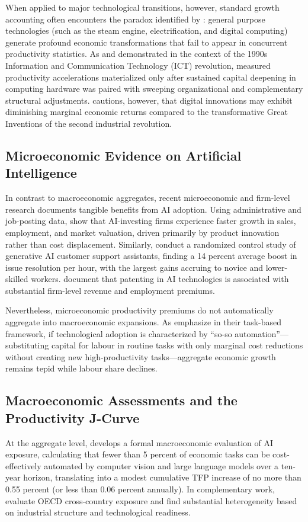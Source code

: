 \documentclass[11pt,a4paper]{article}
\begin{document}
When applied to major technological transitions, however, standard growth accounting often encounters the paradox identified by \citet{bresnahan1995}: general purpose technologies (such as the steam engine, electrification, and digital computing) generate profound economic transformations that fail to appear in concurrent productivity statistics. As \citet{stiroh2002} and \citet{jorgenson2008} demonstrated in the context of the 1990s Information and Communication Technology (ICT) revolution, measured productivity accelerations materialized only after sustained capital deepening in computing hardware was paired with sweeping organizational and complementary structural adjustments. \citet{gordon2016} cautions, however, that digital innovations may exhibit diminishing marginal economic returns compared to the transformative Great Inventions of the second industrial revolution.

\subsection{Microeconomic Evidence on Artificial Intelligence}
In contrast to macroeconomic aggregates, recent microeconomic and firm-level research documents tangible benefits from AI adoption. Using administrative and job-posting data, \citet{babina2024} show that AI-investing firms experience faster growth in sales, employment, and market valuation, driven primarily by product innovation rather than cost displacement. Similarly, \citet{brynjolfsson2023} conduct a randomized control study of generative AI customer support assistants, finding a 14 percent average boost in issue resolution per hour, with the largest gains accruing to novice and lower-skilled workers. \citet{alderucci2020} document that patenting in AI technologies is associated with substantial firm-level revenue and employment premiums. 

Nevertheless, microeconomic productivity premiums do not automatically aggregate into macroeconomic expansions. As \citet{acemoglu2018, acemoglu2020} emphasize in their task-based framework, if technological adoption is characterized by ``so-so automation''---substituting capital for labour in routine tasks with only marginal cost reductions without creating new high-productivity tasks---aggregate economic growth remains tepid while labour share declines.

\subsection{Macroeconomic Assessments and the Productivity J-Curve}
At the aggregate level, \citet{acemoglu2024} develops a formal macroeconomic evaluation of AI exposure, calculating that fewer than 5 percent of economic tasks can be cost-effectively automated by computer vision and large language models over a ten-year horizon, translating into a modest cumulative TFP increase of no more than 0.55 percent (or less than 0.06 percent annually). In complementary work, \citet{filippucci2024} evaluate OECD cross-country exposure and find substantial heterogeneity based on industrial structure and technological readiness.
\end{document}
